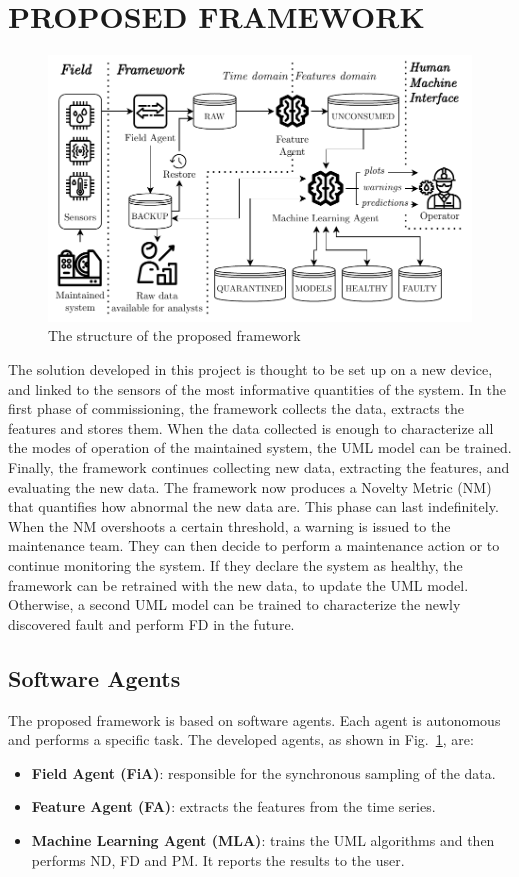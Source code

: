 \section{PROPOSED FRAMEWORK}
\label{sec:framework}
\begin{figure}
    \includegraphics[width=\linewidth]{images/Framework_structure.pdf}
    \caption{The structure of the proposed framework}
    \label{fig:framework_structure}
\end{figure}

The solution developed in this project is thought to be set up on a new device, and linked to the sensors of the most informative quantities of the system.
In the first phase of commissioning, the framework collects the data, extracts the features and stores them. When the data collected is enough to characterize all the modes of operation of the maintained system, the UML model can be trained. Finally, the framework continues collecting new data, extracting the features, and evaluating the new data. The framework now produces a Novelty Metric (NM) that quantifies how abnormal the new data are. 
This phase can last indefinitely. When the NM overshoots a certain threshold, a warning is issued to the maintenance team. They can then decide to perform a maintenance action or to continue monitoring the system. If they declare the system as healthy, the framework can be retrained with the new data, to update the UML model. Otherwise, a second UML model can be trained to characterize the newly discovered fault and perform FD in the future.

\subsection{Software Agents}
The proposed framework is based on software agents. Each agent is autonomous and performs a specific task. The developed agents, as shown in Fig.~\ref{fig:framework_structure}, are:
\begin{itemize}
    \item \textbf{Field Agent (FiA)}: responsible for the synchronous sampling of the data.
    \item \textbf{Feature Agent (FA)}: extracts the features from the time series.
    \item \textbf{Machine Learning Agent (MLA)}: trains the UML algorithms and then performs ND, FD and PM. It reports the results to the user.
\end{itemize}

